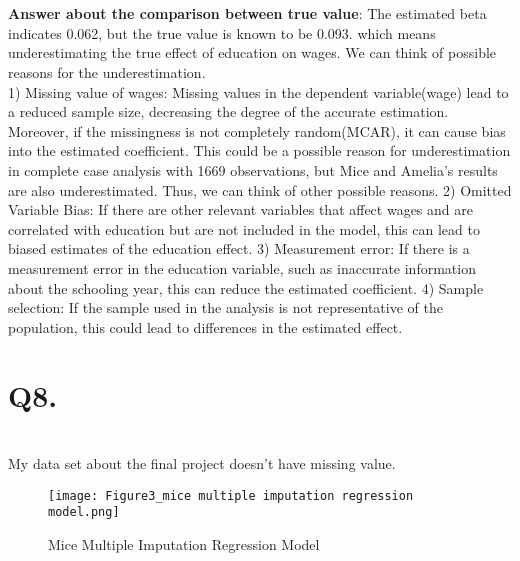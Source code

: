 \documentclass{article}
\begin{document}
\\
\\
\textbf{Answer about the comparison between true value}: The estimated beta indicates 0.062, but the true value is known to be 0.093. which means underestimating the true effect of education on wages. We can think of possible reasons for the underestimation.
\\
1) Missing value of wages: Missing values in the dependent variable(wage) lead to a reduced sample size, decreasing the degree of the accurate estimation. Moreover, if the missingness is not completely random(MCAR), it can cause bias into the estimated coefficient. This could be a possible reason for underestimation in complete case analysis with 1669 observations, but Mice and Amelia's results are also underestimated. Thus, we can think of other possible reasons.
2) Omitted Variable Bias: If there are other relevant variables that affect wages and are correlated with education but are not included in the model, this can lead to biased estimates of the education effect.
3) Measurement error: If there is a measurement error in the education variable, such as inaccurate information about the schooling year, this can reduce the estimated coefficient.
4) Sample selection: If the sample used in the analysis is not representative of the population, this could lead to differences in the estimated effect.

\section{Q8.}
\\
My data set about the final project doesn't have missing value.

\begin{figure}[t]
    \centering
            \caption{Mice Multiple Imputation Regression Model}
        \texttt{[image: Figure3\_mice multiple imputation regression model.png]}
        \label{fig:88mono}
\end{figure}
\end{document}
